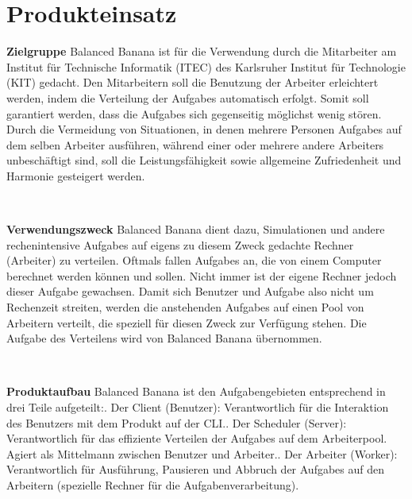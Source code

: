 \documentclass[a4paper,12pt]{article}
\begin{document}
\section{Produkteinsatz}
\begin{itemize}
\begin{minipage}[t]{\linewidth}
\item \textbf{Zielgruppe}\newline
Balanced Banana ist für die Verwendung durch die Mitarbeiter am Institut für Technische Informatik (ITEC) des Karlsruher Institut für Technologie (KIT) gedacht.\newline
Den Mitarbeitern soll die Benutzung der \gls{Arbeiter} erleichtert werden, indem die Verteilung der \glspl{Aufgabe} automatisch erfolgt. Somit soll garantiert werden, dass die \glspl{Aufgabe} sich gegenseitig möglichst wenig stören.\newline
Durch die Vermeidung von Situationen, in denen mehrere Personen \glspl{Aufgabe} auf dem selben \gls{Arbeiter} ausführen, während einer oder mehrere andere \glspl{Arbeiter} unbeschäftigt sind, soll die Leistungsfähigkeit sowie allgemeine Zufriedenheit und Harmonie gesteigert werden.
\end{minipage}
\\

\begin{minipage}[t]{\linewidth}
\item \textbf{Verwendungszweck}\newline
Balanced Banana dient dazu, Simulationen und andere rechenintensive \glspl{Aufgabe} auf eigens zu diesem Zweck gedachte Rechner (\gls{Arbeiter}) zu verteilen.\newline
Oftmals fallen \glspl{Aufgabe} an, die von einem Computer berechnet werden können und sollen. Nicht immer ist der eigene Rechner jedoch dieser \gls{Aufgabe} gewachsen. Damit sich \gls{Benutzer} und \gls{Aufgabe} also nicht um Rechenzeit streiten, werden die anstehenden \glspl{Aufgabe} auf einen Pool von Arbeitern verteilt, die speziell für diesen Zweck zur Verfügung stehen. Die Aufgabe des Verteilens wird von Balanced Banana übernommen.
\end{minipage}
\\

\begin{minipage}[t]{\linewidth}
\item \textbf{Produktaufbau}\newline
Balanced Banana ist den Aufgabengebieten entsprechend in drei Teile aufgeteilt:. Der \gls{Client} (\gls{Benutzer}): Verantwortlich für die Interaktion des Benutzers mit dem Produkt auf der \gls{CLI}.. Der \gls{Scheduler} (\gls{Server}): Verantwortlich für das effiziente Verteilen der \glspl{Aufgabe} auf dem Arbeiterpool. Agiert als Mittelmann zwischen \gls{Benutzer} und \gls{Arbeiter}.. Der \gls{Arbeiter} (Worker): Verantwortlich für Ausführung, Pausieren und Abbruch der \glspl{Aufgabe} auf den Arbeitern (spezielle Rechner für die Aufgabenverarbeitung).
\end{minipage}
\end{itemize}
\end{document}
